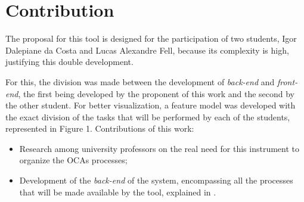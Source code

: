 \section{Contribution}\label{sec:contribution}



The proposal for this tool is designed for the participation of two students, Igor Dalepiane da Costa and Lucas Alexandre Fell, because its complexity is high, justifying this double development.


For this, the division was made between the development of \textit{back-end} and \textit{front-end}, the first being developed by the proponent of this work and the second by the other student. For better visualization, a feature model was developed with the exact division of the tasks that will be performed by each of the students, represented in Figure 1. Contributions of this work:


\begin{itemize}
    \item Research among university professors on the real need for this instrument to organize the \acp{OCA} processes;
    \item Development of the \textit{back-end} of the system, encompassing all the processes that will be made available by the tool, explained in .
\end{itemize}

